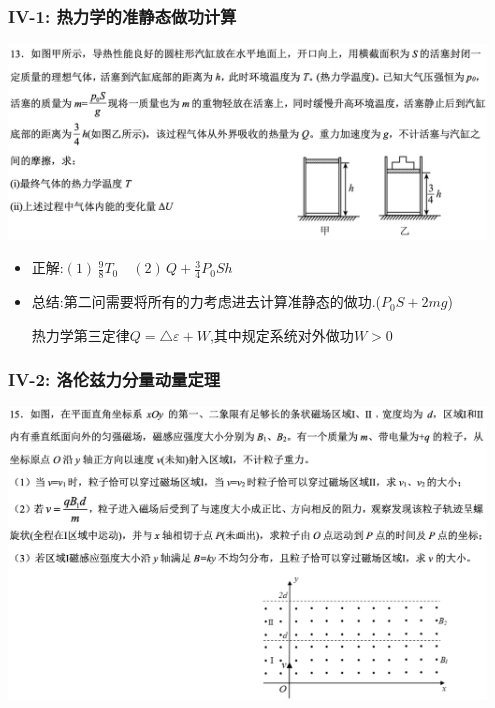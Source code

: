 \documentclass{article}
\begin{document}
\vspace{2em}

\subsubsection{IV-1: 热力学的准静态做功计算}
\includegraphics[width=0.95\textwidth,keepaspectratio]{./pictures/3.11-4.png}

\begin{itemize}
    \item 正解:\quad $(1) \, \frac{9}{8} T_{0} \quad (2) \,Q+\frac{3}{4} P_{0} S h $
    \item 总结:\quad 第二问需要将所有的力考虑进去计算准静态的做功.($P_{0}S + 2mg $)

          \hspace{3.2em}热力学第三定律$Q = \triangle \varepsilon + W$,其中规定系统对外做功$W>0$
\end{itemize}

\vspace{2em}

\subsubsection{IV-2: 洛伦兹力分量动量定理}
\includegraphics[width=0.95\textwidth,keepaspectratio]{./pictures/3.11-5.png}
\end{document}
